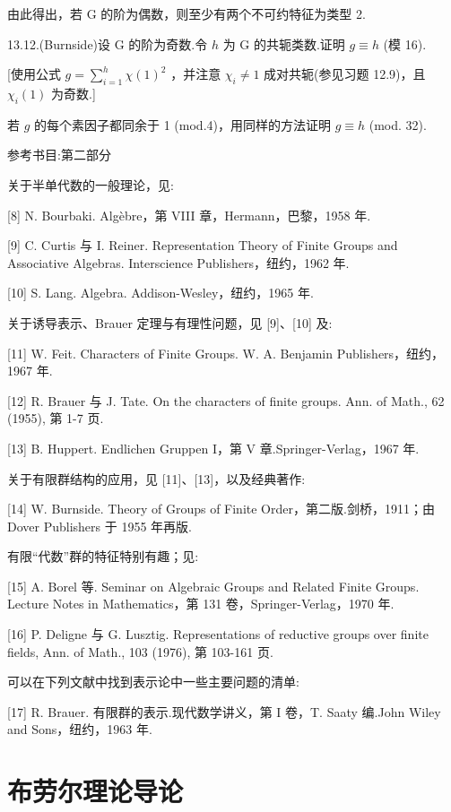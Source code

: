 \documentclass[10pt]{article}
\begin{document}
由此得出，若 G 的阶为偶数，则至少有两个不可约特征为类型 2.

13.12.(Burnside)设 G 的阶为奇数.令 \(h\) 为 G 的共轭类数.证明 \(g \equiv  h\) (模 16).

[使用公式 \(g = \mathop{\sum }\limits_{{i = 1}}^{h}\chi {\left( 1\right) }^{2}\) ，并注意 \({\chi }_{i} \neq  1\) 成对共轭(参见习题 12.9)，且 \({\chi }_{i}\left( 1\right)\) 为奇数.]

若 \(g\) 的每个素因子都同余于 1 (mod.4)，用同样的方法证明 \(g \equiv  h\) (mod. 32).

参考书目:第二部分

关于半单代数的一般理论，见:

[8] N. Bourbaki. Algèbre，第 VIII 章，Hermann，巴黎，1958 年.

[9] C. Curtis 与 I. Reiner. Representation Theory of Finite Groups and Associative Algebras. Interscience Publishers，纽约，1962 年.

[10] S. Lang. Algebra. Addison-Wesley，纽约，1965 年.

关于诱导表示、Brauer 定理与有理性问题，见 [9]、[10] 及:

[11] W. Feit. Characters of Finite Groups. W. A. Benjamin Publishers，纽约，1967 年.

[12] R. Brauer 与 J. Tate. On the characters of finite groups. Ann. of Math., 62 (1955), 第 1-7 页.

[13] B. Huppert. Endlichen Gruppen I，第 V 章.Springer-Verlag，1967 年.

关于有限群结构的应用，见 [11]、[13]，以及经典著作:

[14] W. Burnside. Theory of Groups of Finite Order，第二版.剑桥，1911；由 Dover Publishers 于 1955 年再版.

有限“代数”群的特征特别有趣；见:

[15] A. Borel 等. Seminar on Algebraic Groups and Related Finite Groups. Lecture Notes in Mathematics，第 131 卷，Springer-Verlag，1970 年.

[16] P. Deligne 与 G. Lusztig. Representations of reductive groups over finite fields, Ann. of Math., 103 (1976), 第 103-161 页.

可以在下列文献中找到表示论中一些主要问题的清单:

[17] R. Brauer. 有限群的表示.现代数学讲义，第 I 卷，T. Saaty 编.John Wiley and Sons，纽约，1963 年.

\section*{布劳尔理论导论}
\end{document}
